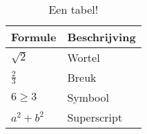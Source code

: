 \documentclass{article}
\begin{document}
\begin{table}[htbp]
    \centering
    \begin{tabularx}{0.7\textwidth}{X X}
        \toprule
        Formule & Beschrijving\\
        \midrule
        $ \sqrt{2} $ & Wortel\\
        $ \frac{2}{3} $ & Breuk\\
        $ 6\geq 3 $ & Symbool\\
        $ a^2 + b^2 $ & Superscript\\
        \bottomrule
    \end{tabularx}
    \caption{Een tabel!}
\end{table}
\end{document}
